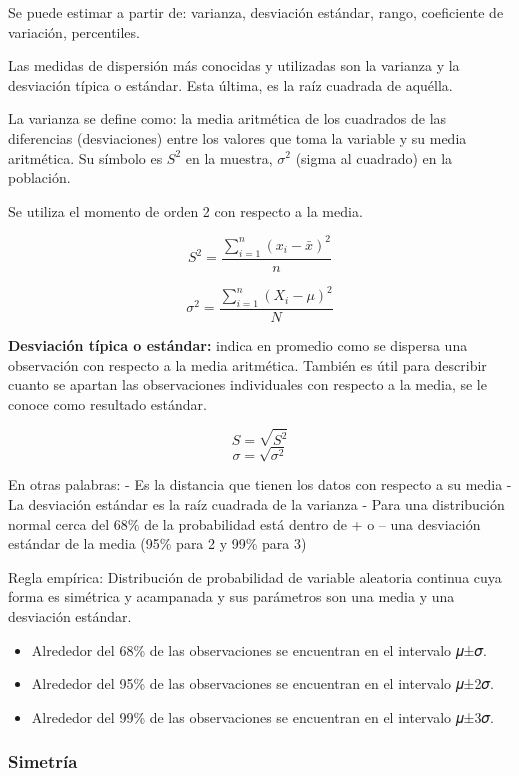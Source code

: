 \documentclass[
]{book}
\providecommand{\tightlist}{%
  \setlength{\itemsep}{0pt}\setlength{\parskip}{0pt}}
\begin{document}
Se puede estimar a partir de: varianza, desviación estándar, rango, coeficiente de variación, percentiles.

Las medidas de dispersión más conocidas y utilizadas son la varianza y la desviación típica o estándar. Esta última, es la raíz cuadrada de aquélla.

La varianza se define como: la media aritmética de los cuadrados de las diferencias (desviaciones) entre los valores que toma la variable y su media aritmética. Su símbolo es \(S^2\) en la muestra, \(\sigma^2\) (sigma al cuadrado) en la población.

Se utiliza el momento de orden 2 con respecto a la media.

\[S^2 = \frac{\sum_{i=1}^n (x_i - \bar{x})^2}{n}\]

\[\sigma^2 = \frac{\sum_{i=1}^n (X_i - \mu)^2}{N}\]

\textbf{Desviación típica o estándar:} indica en promedio como se dispersa una observación con respecto a la media aritmética. También es útil para describir cuanto se apartan las observaciones individuales con respecto a la media, se le conoce como resultado estándar.

\[S = \sqrt{S^2}\]
\[\sigma = \sqrt{\sigma^2}\]

En otras palabras:
- Es la distancia que tienen los datos con respecto a su media
- La desviación estándar es la raíz cuadrada de la varianza
- Para una distribución normal cerca del 68\% de la probabilidad está dentro de + o -- una desviación estándar de la media (95\% para 2 y 99\% para 3)

Regla empírica:
Distribución de probabilidad de variable aleatoria continua cuya forma es simétrica y acampanada y sus parámetros son una media y una desviación estándar.

\begin{itemize}
\tightlist
\item
  Alrededor del 68\% de las observaciones se encuentran en el intervalo 𝜇±𝜎.
\item
  Alrededor del 95\% de las observaciones se encuentran en el intervalo 𝜇±2𝜎.
\item
  Alrededor del 99\% de las observaciones se encuentran en el intervalo 𝜇±3𝜎.
\end{itemize}

\hypertarget{simetruxeda}{%
\subsubsection{Simetría}\label{simetruxeda}}
\end{document}
